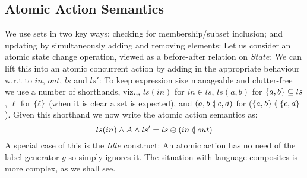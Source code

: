 \subsection{Atomic Action Semantics}

We use sets in two key ways:
checking for membership/subset inclusion;
and updating by simultaneously adding and removing elements:
Let us consider an atomic state change operation,
viewed as a before-after relation on $State$:
We can lift this into an atomic concurrent action by adding in
the appropriate behaviour w.r.t to $in$, $out$, $ls$ and $ls'$:
\noindent
To keep expression size manageable and clutter-free
we use a number of shorthands,
viz.,, $ls(in)$ for $ in \in ls$, $ls(a,b)$ for $\{{a,b}\}\subseteq ls$,
$\ell$ for $\{{\ell}\}$ (when it is clear a set is expected),
and $(a,b \mathbin{\langle\!|} c,d)$ for ($\{{a,b}\}\mathbin{\langle\!|} \{{c,d}\}$).
Given this shorthand we now write the atomic action semantics as:
\begin{equation*}
ls(in) \land A \land ls'=ls\ominus(in \mathbin{\langle\!|} out)
\end{equation*}
A special case of this is the $Idle$ construct:
An atomic action has no need of the label generator $g$
so simply ignores it.
The situation with language composites is more complex, as we shall see.

